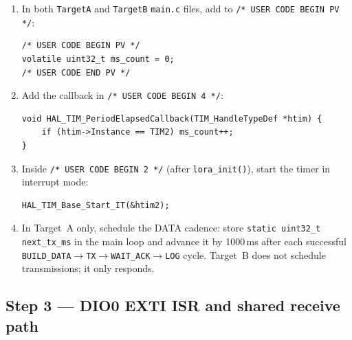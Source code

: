 \documentclass[11pt,letterpaper]{article}
\begin{document}
\begin{enumerate}[leftmargin=2em]
	\item In both \texttt{TargetA} and \texttt{TargetB} \texttt{main.c} files, add to \texttt{/* USER CODE BEGIN PV */}:
\begin{verbatim}
/* USER CODE BEGIN PV */
volatile uint32_t ms_count = 0;
/* USER CODE END PV */
\end{verbatim}
	\item Add the callback in \texttt{/* USER CODE BEGIN 4 */}:
\begin{verbatim}
void HAL_TIM_PeriodElapsedCallback(TIM_HandleTypeDef *htim) {
    if (htim->Instance == TIM2) ms_count++;
}
\end{verbatim}
	\item Inside \texttt{/* USER CODE BEGIN 2 */} (after \texttt{lora\_init()}), start the timer in interrupt mode:
\begin{verbatim}
HAL_TIM_Base_Start_IT(&htim2);
\end{verbatim}
	\item In Target~A only, schedule the DATA cadence: store \texttt{static uint32\_t next\_tx\_ms} in the main loop and advance it by 1000\,ms after each successful \texttt{BUILD\_DATA}$\to$\texttt{TX}$\to$\texttt{WAIT\_ACK}$\to$\texttt{LOG} cycle. Target~B does not schedule transmissions; it only responds.
\end{enumerate}

\newpage
\subsection{Step 3 --- DIO0 EXTI ISR and shared receive path}
\end{document}
